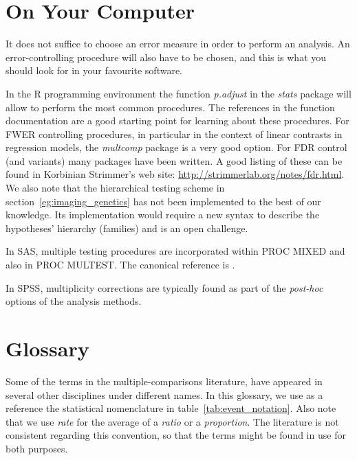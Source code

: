 \documentclass[review,12pt]{article}
\begin{document}
\appendix

\section{\label{sec:on_your_pc} On Your Computer}
It does not suffice to choose an error measure in order to perform an analysis. An error-controlling procedure will also have to be chosen, and this is what you should look for in your favourite software. 

In the R programming environment \citep{r_development_core_team_r:_2011} the function \emph{p.adjust} in the \emph{stats} package will allow to perform the most common procedures. The references in the function documentation are a good starting point for learning about these procedures. 
For FWER controlling procedures, in particular in the context of linear contrasts in regression models, the \emph{multcomp} package is a very good option. 
For FDR control (and variants) many packages have been written. A good listing of these can be found in Korbinian Strimmer's web site: \url{http://strimmerlab.org/notes/fdr.html}. 
We also note that the hierarchical testing scheme in section~\ref{eg:imaging_genetics} has not been implemented to the best of our knowledge. Its implementation would require a new syntax to describe the hypotheses' hierarchy (families) and is an open challenge. 

In SAS, multiple testing procedures are incorporated within PROC MIXED and also in PROC MULTEST.  The canonical reference is \citet{westfall_multiple_2011}. 

In SPSS, multiplicity corrections are typically found as part of the \emph{post-hoc} options of the analysis methods.



\section{\label{sec:glossary} Glossary}
Some of the terms in the multiple-comparisons literature, have appeared in several other disciplines under different names. In this glossary, we use as a reference the statistical nomenclature in table~\ref{tab:event_notation}. Also note that we use \emph{rate} for the average of a \emph{ratio} or a \emph{proportion}. The literature is not consistent regarding this convention, so that the terms might be found in use for both purposes.
\end{document}
